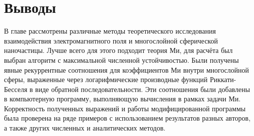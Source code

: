 \section{Выводы}

В главе рассмотрены различные методы теоретического исследования
взаимодействия электромагнитного поля и многослойной сферической
наночастицы. Лучше всего для этого подходит теория Ми, для расчёта был
выбран алгоритм с максимальной численной устойчивостью.  Были получены
явные рекуррентные соотношения для коэффициентов Ми внутри
многослойной сферы, выраженные через логарифмические производные
функций Риккати-Бесселя в виде обратной последовательности.  Эти
соотношения были добавлены в компьютерную программу, выполняющую
вычисления в рамках задачи Ми. Корректность полученных выражений и
работы модифицированной программы была проверена на ряде примеров с
использованием результатов разных авторов, а также других численных и
аналитических методов.




\clearpage